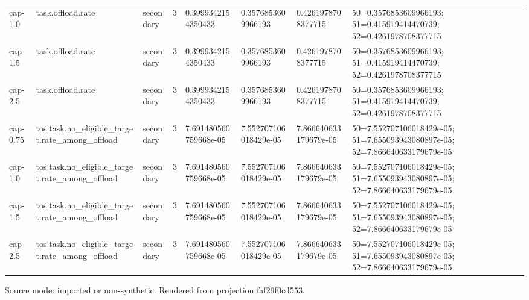 {\begin{table}[htbp]
\begin{tabular}{llllllll}
cap-1.0 & task.offload.rate & secondary & 3 & 0.3999342154350433 & 0.3576853609966193 & 0.4261978708377715 & 50=0.3576853609966193; 51=0.415919414470739; 52=0.4261978708377715 \\
cap-1.5 & task.offload.rate & secondary & 3 & 0.3999342154350433 & 0.3576853609966193 & 0.4261978708377715 & 50=0.3576853609966193; 51=0.415919414470739; 52=0.4261978708377715 \\
cap-2.5 & task.offload.rate & secondary & 3 & 0.3999342154350433 & 0.3576853609966193 & 0.4261978708377715 & 50=0.3576853609966193; 51=0.415919414470739; 52=0.4261978708377715 \\
cap-0.75 & tos.task.no\_eligible\_target.rate\_among\_offload & secondary & 3 & 7.691480560759668e-05 & 7.552707106018429e-05 & 7.866640633179679e-05 & 50=7.552707106018429e-05; 51=7.655093943080897e-05; 52=7.866640633179679e-05 \\
cap-1.0 & tos.task.no\_eligible\_target.rate\_among\_offload & secondary & 3 & 7.691480560759668e-05 & 7.552707106018429e-05 & 7.866640633179679e-05 & 50=7.552707106018429e-05; 51=7.655093943080897e-05; 52=7.866640633179679e-05 \\
cap-1.5 & tos.task.no\_eligible\_target.rate\_among\_offload & secondary & 3 & 7.691480560759668e-05 & 7.552707106018429e-05 & 7.866640633179679e-05 & 50=7.552707106018429e-05; 51=7.655093943080897e-05; 52=7.866640633179679e-05 \\
cap-2.5 & tos.task.no\_eligible\_target.rate\_among\_offload & secondary & 3 & 7.691480560759668e-05 & 7.552707106018429e-05 & 7.866640633179679e-05 & 50=7.552707106018429e-05; 51=7.655093943080897e-05; 52=7.866640633179679e-05 \\
\hline
\end{tabular}
\par\footnotesize
Source mode: imported or non-synthetic.
Rendered from projection faf29f0cd553.
\end{table}
}
